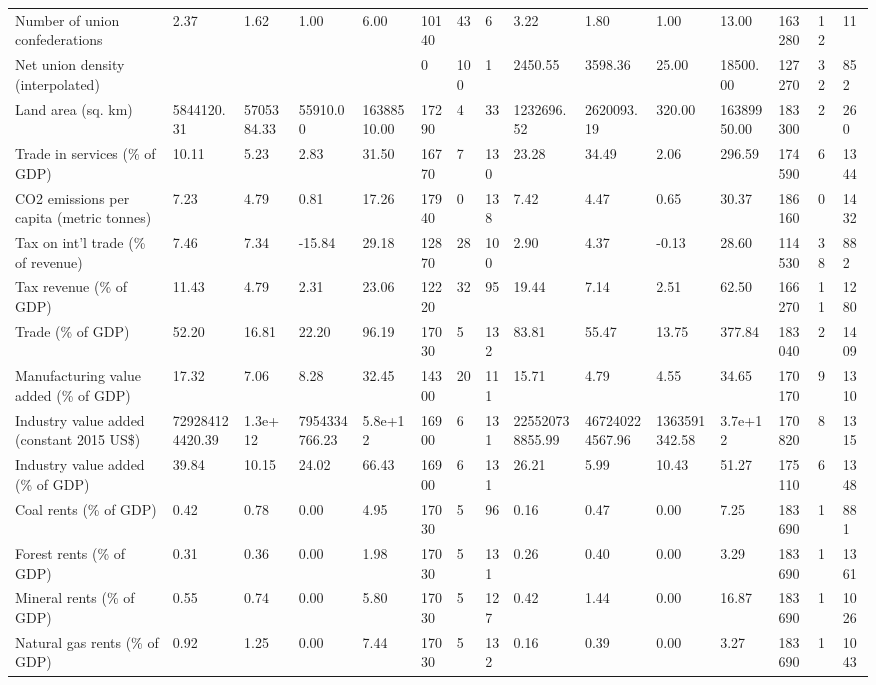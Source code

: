 \begin{longtable}{lllllllllllllll}
Number of union confederations & 2.37 & 1.62 & 1.00 & 6.00 & 10140 & 43 & 6 & 3.22 & 1.80 & 1.00 & 13.00 & 163280 & 12 & 11\\
Net union density (interpolated) &  &  &  &  & 0 & 100 & 1 & 2450.55 & 3598.36 & 25.00 & 18500.00 & 127270 & 32 & 852\\
Land area (sq. km) & 5844120.31 & 5705384.33 & 55910.00 & 16388510.00 & 17290 & 4 & 33 & 1232696.52 & 2620093.19 & 320.00 & 16389950.00 & 183300 & 2 & 260\\
\addlinespace
Trade in services (\% of GDP) & 10.11 & 5.23 & 2.83 & 31.50 & 16770 & 7 & 130 & 23.28 & 34.49 & 2.06 & 296.59 & 174590 & 6 & 1344\\
CO2 emissions per capita (metric tonnes) & 7.23 & 4.79 & 0.81 & 17.26 & 17940 & 0 & 138 & 7.42 & 4.47 & 0.65 & 30.37 & 186160 & 0 & 1432\\
Tax on int'l trade (\% of revenue) & 7.46 & 7.34 & -15.84 & 29.18 & 12870 & 28 & 100 & 2.90 & 4.37 & -0.13 & 28.60 & 114530 & 38 & 882\\
Tax revenue (\% of GDP) & 11.43 & 4.79 & 2.31 & 23.06 & 12220 & 32 & 95 & 19.44 & 7.14 & 2.51 & 62.50 & 166270 & 11 & 1280\\
Trade (\% of GDP) & 52.20 & 16.81 & 22.20 & 96.19 & 17030 & 5 & 132 & 83.81 & 55.47 & 13.75 & 377.84 & 183040 & 2 & 1409\\
\addlinespace
Manufacturing value added (\% of GDP) & 17.32 & 7.06 & 8.28 & 32.45 & 14300 & 20 & 111 & 15.71 & 4.79 & 4.55 & 34.65 & 170170 & 9 & 1310\\
Industry value added (constant 2015 US\$) & 729284124420.39 & 1.3e+12 & 7954334766.23 & 5.8e+12 & 16900 & 6 & 131 & 225520738855.99 & 467240224567.96 & 1363591342.58 & 3.7e+12 & 170820 & 8 & 1315\\
Industry value added (\% of GDP) & 39.84 & 10.15 & 24.02 & 66.43 & 16900 & 6 & 131 & 26.21 & 5.99 & 10.43 & 51.27 & 175110 & 6 & 1348\\
Coal rents (\% of GDP) & 0.42 & 0.78 & 0.00 & 4.95 & 17030 & 5 & 96 & 0.16 & 0.47 & 0.00 & 7.25 & 183690 & 1 & 881\\
Forest rents (\% of GDP) & 0.31 & 0.36 & 0.00 & 1.98 & 17030 & 5 & 131 & 0.26 & 0.40 & 0.00 & 3.29 & 183690 & 1 & 1361\\
\addlinespace
Mineral rents (\% of GDP) & 0.55 & 0.74 & 0.00 & 5.80 & 17030 & 5 & 127 & 0.42 & 1.44 & 0.00 & 16.87 & 183690 & 1 & 1026\\
Natural gas rents (\% of GDP) & 0.92 & 1.25 & 0.00 & 7.44 & 17030 & 5 & 132 & 0.16 & 0.39 & 0.00 & 3.27 & 183690 & 1 & 1043\\

\end{longtable}
